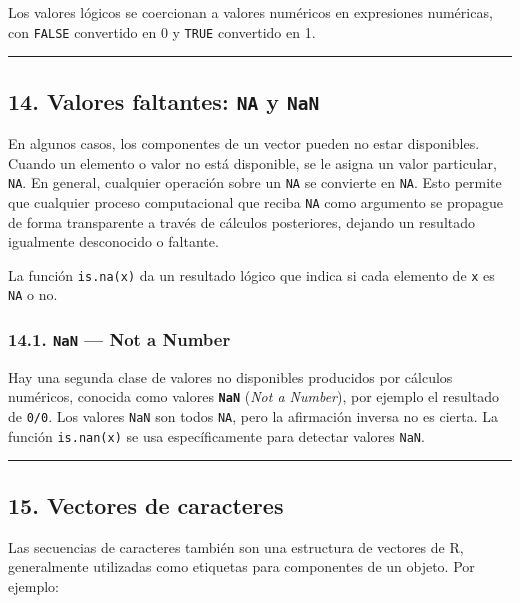 \documentclass[
  jou,
  floatsintext,
  longtable,
  a4paper,
  nolmodern,
  notxfonts,
  notimes,
  12pt,
  colorlinks=true,linkcolor=blue,citecolor=blue,urlcolor=blue]{apa7}
\begin{document}
Los valores lógicos se coercionan a valores numéricos en expresiones
numéricas, con \texttt{FALSE} convertido en 0 y \texttt{TRUE} convertido
en 1.

\begin{center}\rule{0.5\linewidth}{0.5pt}\end{center}

\subsection{\texorpdfstring{14. Valores faltantes: \texttt{NA} y
\texttt{NaN}}{14. Valores faltantes: NA y NaN}}\label{valores-faltantes-na-y-nan}

En algunos casos, los componentes de un vector pueden no estar
disponibles. Cuando un elemento o valor no está disponible, se le asigna
un valor particular, \texttt{NA}. En general, cualquier operación sobre
un \texttt{NA} se convierte en \texttt{NA}. Esto permite que cualquier
proceso computacional que reciba \texttt{NA} como argumento se propague
de forma transparente a través de cálculos posteriores, dejando un
resultado igualmente desconocido o faltante.

La función \texttt{is.na(x)} da un resultado lógico que indica si cada
elemento de \texttt{x} es \texttt{NA} o no.

\subsubsection{\texorpdfstring{14.1. \texttt{NaN} --- Not a
Number}{14.1. NaN --- Not a Number}}\label{nan-not-a-number}

Hay una segunda clase de valores no disponibles producidos por cálculos
numéricos, conocida como valores \textbf{\texttt{NaN}} (\emph{Not a
Number}), por ejemplo el resultado de \texttt{0/0}. Los valores
\texttt{NaN} son todos \texttt{NA}, pero la afirmación inversa no es
cierta. La función \texttt{is.nan(x)} se usa específicamente para
detectar valores \texttt{NaN}.

\begin{center}\rule{0.5\linewidth}{0.5pt}\end{center}

\subsection{15. Vectores de caracteres}\label{vectores-de-caracteres}

Las secuencias de caracteres también son una estructura de vectores de
R, generalmente utilizadas como etiquetas para componentes de un objeto.
Por ejemplo:
\end{document}
